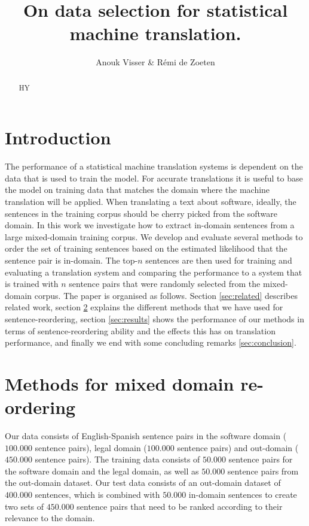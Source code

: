 \documentclass[11pt]{article}
\title{On data selection for statistical machine translation.}
\author{Anouk Visser \& R\'emi de Zoeten}
\date{}
\begin{document}
\maketitle

\begin{abstract}
HY
\end{abstract}

\section{Introduction}
\label{sec:intro}
The performance of a statistical machine translation systems is dependent on the data that is used to train the model. For accurate translations it is useful to base the model on training data that matches the domain where the machine translation will be applied. When translating a text about software, ideally, the sentences in the training corpus should be cherry picked from the software domain. 
In this work we investigate how to extract in-domain sentences from a large mixed-domain training corpus. We develop and evaluate several methods to order the set of training sentences based on the estimated likelihood that the sentence pair is in-domain. The top-$n$ sentences are then used for training and evaluating a translation system and comparing the performance to a system that is trained with $n$ sentence pairs that were randomly selected from the mixed-domain corpus.
The paper is organised as follows. Section \ref{sec:related} describes related work, section \ref{sec:methods} explains the different methods that we have used for sentence-reordering, section \ref{sec:results} shows the performance of our methods in terms of sentence-reordering ability and the effects this has on translation performance, and finally we end with some concluding remarks \ref{sec:conclusion}.

\section{Methods for mixed domain re-ordering}
\label{sec:methods}
Our data consists of English-Spanish sentence pairs in the software domain ($100.000$ sentence pairs), legal domain ($100.000$ sentence pairs) and out-domain ($450.000$ sentence pairs). The training data consists of $50.000$ sentence pairs for the software domain and the legal domain, as well as $50.000$ sentence pairs from the out-domain dataset.
Our test data consists of an out-domain dataset of $400.000$ sentences, which is combined with $50.000$ in-domain sentences to create two sets of $450.000$ sentence pairs that need to be ranked according to their relevance to the domain.
\end{document}
